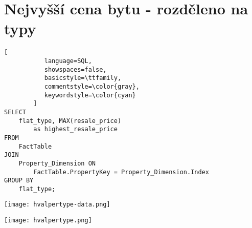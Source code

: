 \section{Nejvyšší cena bytu - rozděleno na typy}

\begin{lstlisting}[
           language=SQL,
           showspaces=false,
           basicstyle=\ttfamily,
           commentstyle=\color{gray},
           keywordstyle=\color{cyan}
        ]
SELECT 
    flat_type, MAX(resale_price) 
        as highest_resale_price 
FROM 
    FactTable 
JOIN 
    Property_Dimension ON 
        FactTable.PropertyKey = Property_Dimension.Index 
GROUP BY 
    flat_type;
\end{lstlisting}

\texttt{[image: hvalpertype-data.png]}

\texttt{[image: hvalpertype.png]}
